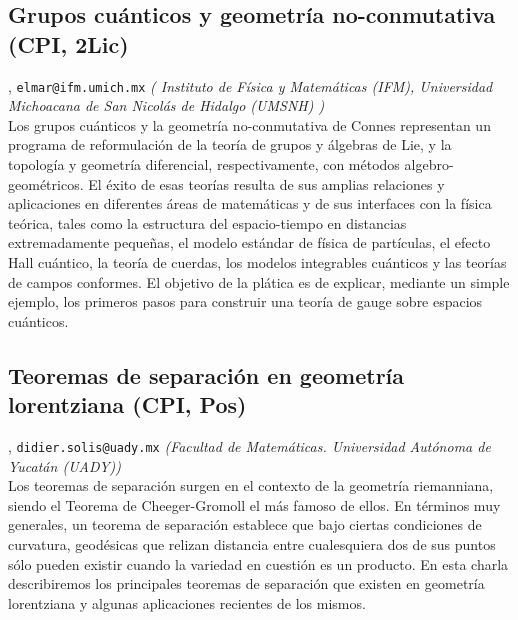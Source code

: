 \subsection{\sffamily Grupos cu\'anticos y geometr\'ia no-conmutativa {\footnotesize (CPI, 2Lic)}} \label{reg-773} 
, {\tt elmar@ifm.umich.mx}  {\slshape ( Instituto de F\'isica y Matem\'aticas (IFM),  Universidad Michoacana de San Nicol\'as de Hidalgo (UMSNH) )}\\
          \noindent Los grupos cu\'anticos y la geometr\'ia no-conmutativa de Connes representan un programa de reformulaci\'on de la teor\'ia de grupos y \'algebras de Lie, y la topolog\'ia y geometr\'ia diferencial, respectivamente, con m\'etodos algebro-geom\'etricos. El \'exito de esas teor\'ias resulta de sus amplias relaciones y aplicaciones en diferentes \'areas de matem\'aticas y de sus interfaces con la f\'isica te\'orica, tales como la estructura del espacio-tiempo en distancias extremadamente peque\~nas,  el modelo est\'andar de f\'isica de part\'iculas, el efecto Hall cu\'antico, la teor\'ia de cuerdas, los modelos integrables cu\'anticos y las teor\'ias de campos conformes. El objetivo de la pl\'atica es de explicar, mediante un simple ejemplo, los primeros pasos para construir una teor\'ia de gauge sobre espacios cu\'anticos.
\subsection{\sffamily Teoremas de separaci\'on en geometr\'ia lorentziana {\footnotesize (CPI, Pos)}} \label{reg-1566} 
, {\tt didier.solis@uady.mx}  {\slshape (Facultad de Matem\'aticas. Universidad Aut\'onoma de Yucat\'an (UADY))}\\
          \noindent Los teoremas de separaci\'on surgen en el contexto de la geometr\'ia riemanniana, siendo el Teorema de Cheeger-Gromoll el m\'as famoso de ellos. En t\'erminos muy generales, un teorema de separaci\'on establece que bajo ciertas condiciones de curvatura, geod\'esicas que relizan distancia entre cualesquiera dos de sus puntos s\'olo pueden existir cuando la variedad en cuesti\'on es un producto.  En esta charla describiremos los principales teoremas de separaci\'on que existen en geometr\'ia lorentziana y algunas aplicaciones recientes de los mismos.
